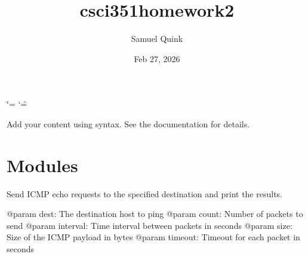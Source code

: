 \documentclass[letterpaper,10pt,english]{sphinxmanual}
\title{csci\sphinxhyphen{}351\sphinxhyphen{}homework2}
\date{Feb 27, 2026}
\author{Samuel Quink}
\begin{document}
\ifdefined\shorthandoff
  \ifnum\catcode`\=\string=\active\shorthandoff{=}\fi
  \ifnum\catcode`\"=\active{}\fi
\fi

\pagestyle{empty}
\sphinxmaketitle
\pagestyle{plain}
\sphinxtableofcontents
\pagestyle{normal}
\label{\detokenize{index::doc}}


\sphinxAtStartPar
Add your content using  syntax. See the
documentation for details.

\sphinxstepscope


\chapter{Modules}
\label{\detokenize{modules:module-my_ping}}\label{\detokenize{modules:modules}}\label{\detokenize{modules::doc}}

\begin{fulllineitems}
\label{\detokenize{modules:my_ping.ping}}
\pysigstartsignatures
\pysiglinewithargsret
{}
{\sphinxparamcomma {}\sphinxparamcomma {}\sphinxparamcomma {}\sphinxparamcomma {}}
{}
\pysigstopsignatures
\sphinxAtStartPar
Send ICMP echo requests to the specified destination and print the results.

\sphinxAtStartPar
@param dest: The destination host to ping
@param count: Number of packets to send
@param interval: Time interval between packets in seconds
@param size: Size of the ICMP payload in bytes
@param timeout: Timeout for each packet in seconds

\end{fulllineitems}

\label{\detokenize{modules:module-my_traceroute}}
\end{document}
